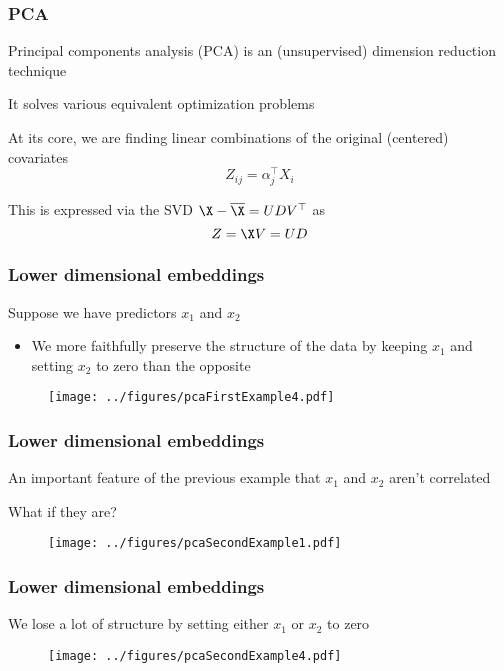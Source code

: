\documentclass[12pt]{beamer}
\begin{document}
\begin{frame}[fragile]
\frametitle{PCA}
Principal components analysis (PCA) is an (unsupervised) dimension reduction technique

\vsp
It solves various equivalent optimization problems


\vsp
At its core, we are finding linear combinations of the original (centered) covariates
\[
Z_{ij} = \alpha_j^{\top} X_i
\]

\vsp
This is expressed via the SVD $\X - \overline{\X} = UDV^{\top}$ as
\[
Z = \X V = UD
\]
\end{frame}




\begin{frame}[fragile]
\frametitle{Lower dimensional embeddings}
Suppose we have predictors $x_1$ and $x_2$ 
\begin{itemize}
\item We more faithfully preserve the
structure of the data by keeping $x_1$ and setting $x_2$ to zero than the opposite
\end{itemize}
\begin{figure}
\centering
\texttt{[image: ../figures/pcaFirstExample4.pdf]}
\end{figure}
\end{frame}


\begin{frame}[fragile]
\frametitle{Lower dimensional embeddings}
An important feature of the previous example that $x_1$ and $x_2$ aren't correlated
\vsp

What if they are?
\begin{figure}
\centering
\texttt{[image: ../figures/pcaSecondExample1.pdf]}
\end{figure}
\end{frame}

\begin{frame}[fragile]
\frametitle{Lower dimensional embeddings}
We  lose a lot of structure by setting either $x_1$ or $x_2$ to zero

\vsp
\begin{figure}
\centering
\texttt{[image: ../figures/pcaSecondExample4.pdf]}
\end{figure}
\end{frame}
\end{document}
